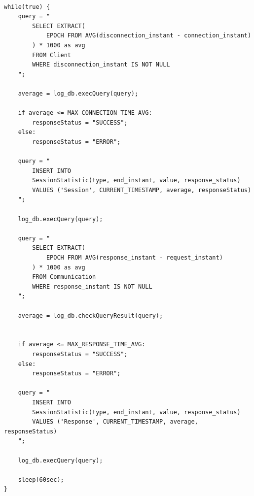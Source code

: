 \documentclass[12pt]{report}
\begin{document}
\begin{verbatim}

while(true) {
    query = "
        SELECT EXTRACT(
            EPOCH FROM AVG(disconnection_instant - connection_instant)
        ) * 1000 as avg
        FROM Client
        WHERE disconnection_instant IS NOT NULL
    ";

    average = log_db.execQuery(query);

    if average <= MAX_CONNECTION_TIME_AVG:
        responseStatus = "SUCCESS";
    else:
        responseStatus = "ERROR";

    query = "
        INSERT INTO
        SessionStatistic(type, end_instant, value, response_status)
        VALUES ('Session', CURRENT_TIMESTAMP, average, responseStatus)
    ";

    log_db.execQuery(query);

    query = "
        SELECT EXTRACT(
            EPOCH FROM AVG(response_instant - request_instant)
        ) * 1000 as avg
        FROM Communication
        WHERE response_instant IS NOT NULL
    ";

    average = log_db.checkQueryResult(query);

    
    if average <= MAX_RESPONSE_TIME_AVG:
        responseStatus = "SUCCESS";
    else:
        responseStatus = "ERROR";

    query = "
        INSERT INTO
        SessionStatistic(type, end_instant, value, response_status)
        VALUES ('Response', CURRENT_TIMESTAMP, average, responseStatus)
    ";

    log_db.execQuery(query);

    sleep(60sec);
}

\end{verbatim}
\end{document}
